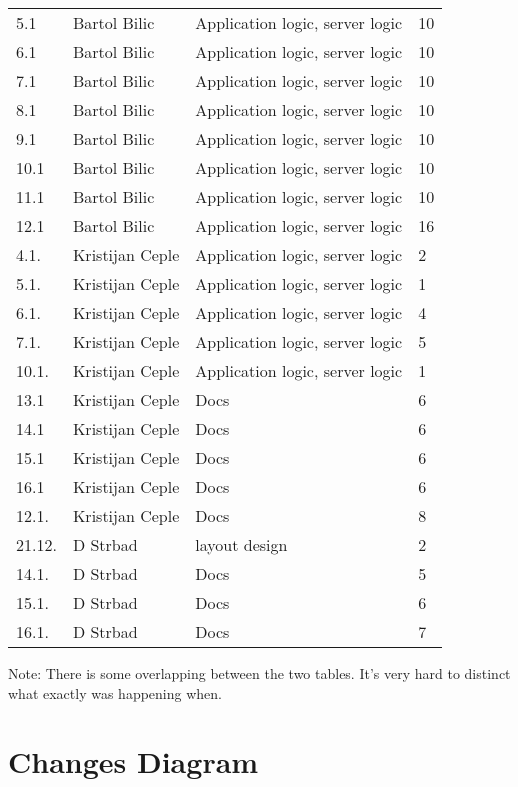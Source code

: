 \begin{longtable}{llll}
			5.1              & Bartol Bilic                  & Application logic, server logic & 10        \\
			6.1              & Bartol Bilic                  & Application logic, server logic & 10        \\
			7.1              & Bartol Bilic                  & Application logic, server logic & 10        \\
			8.1              & Bartol Bilic                  & Application logic, server logic & 10        \\
			9.1              & Bartol Bilic                  & Application logic, server logic & 10        \\
			10.1             & Bartol Bilic                  & Application logic, server logic & 10        \\
			11.1             & Bartol Bilic                  & Application logic, server logic & 10        \\
			12.1             & Bartol Bilic                  & Application logic, server logic & 16        \\
			4.1.             & Kristijan Ceple               & Application logic, server logic & 2         \\
			5.1.             & Kristijan Ceple               & Application logic, server logic & 1         \\
			6.1.             & Kristijan Ceple               & Application logic, server logic & 4         \\
			7.1.             & Kristijan Ceple               & Application logic, server logic & 5         \\
			10.1.            & Kristijan Ceple               & Application logic, server logic & 1         \\
			13.1             & Kristijan Ceple               & Docs                           & 6         \\
			14.1             & Kristijan Ceple               & Docs                            & 6         \\
			15.1             & Kristijan Ceple               & Docs                            & 6         \\
			16.1             & Kristijan Ceple               & Docs                            & 6         \\
			12.1.            & Kristijan Ceple               & Docs                            & 8         \\
			21.12.           & D Strbad                      & layout design                   & 2         \\
			14.1.            & D Strbad                      & Docs                            & 5         \\
			15.1.            & D Strbad                      & Docs                            & 6         \\
			16.1.            & D Strbad                      & Docs                            & 7        
		\end{longtable}
				
		Note: There is some overlapping between the two tables. It's very hard to distinct what exactly was happening when.
		\eject
		\section*{Changes Diagram}
		
		
		
	
